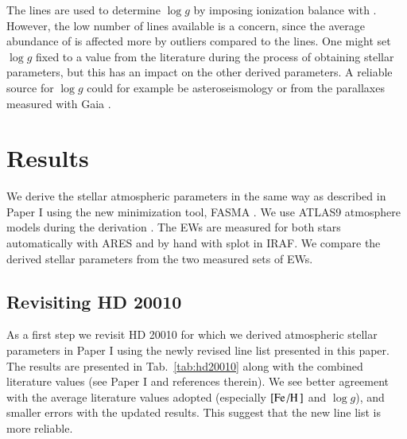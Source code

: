 \documentclass{aa}
\begin{document}
The  lines are used to determine $\log g$ by imposing ionization
balance with . However, the low number of  lines
available is a concern, since the average abundance of  is affected
more by outliers compared to the  lines. One might set $\log g$ fixed
to a value from the literature during the process of obtaining stellar
parameters, but this has an impact on the other derived parameters. A reliable
source for $\log g$ could for example be asteroseismology \citep[see
e.g.][]{Aerts2010} or from the parallaxes measured with Gaia \citep{GAIA}.



\section{Results}
\label{sec:results}

We derive the stellar atmospheric parameters in the same way as described in
Paper I using the new minimization tool, FASMA \citep{Andreasen2017a}. We use
ATLAS9 atmosphere models during the derivation \citep{Kurucz1993}. The EWs are
measured for both stars automatically with ARES \citep{Sousa2015a} and by hand
with splot in IRAF. We compare the derived stellar parameters from the two
measured sets of EWs.


\subsection{Revisiting HD 20010}
\label{sec:hd20010}

As a first step we revisit HD 20010 for which we derived atmospheric stellar
parameters in Paper I using the newly revised line list presented in this paper.
The results are presented in Tab.~\ref{tab:hd20010} along with the combined
literature values (see Paper I and references therein). We see better agreement
with the average literature values adopted (especially $[\ion{Fe}/\ion{H}]$ and
$\log g$), and smaller errors with the updated results. This suggest that the
new line list is more reliable.
\end{document}
